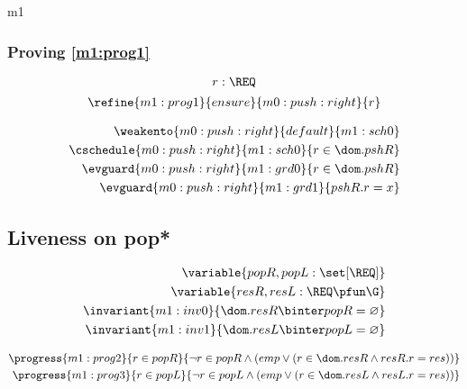 \documentclass[12pt]{amsart}
\begin{document}
\begin{machine}{m1}
\subsubsection{Proving \ref{m1:prog1}}
\[ \indices{m0:push:right}{ r : \REQ } \]
\begin{align*}
\refine{m1:prog1}{ensure}{m0:push:right}{ \index{r}{r} }
\end{align*}

\begin{align*}
\weakento{m0:push:right}{default}{m1:sch0}
\\ \cschedule{m0:push:right}{m1:sch0}{ r \in \dom.pshR }
\\ \evguard{m0:push:right}{m1:grd0}{ r \in \dom.pshR }
\\ \evguard{m0:push:right}{m1:grd1}{ pshR.r = x }
\end{align*}

\subsection{Liveness on pop*}

\begin{align*}
\variable{ popR, popL : \set [\REQ]}
\\ \variable{ resR, resL : \REQ \pfun \G }
\\ \invariant{m1:inv0}{ \dom.resR \binter popR = \emptyset }
\\ \invariant{m1:inv1}{ \dom.resL \binter popL = \emptyset }
\end{align*}

\begin{align*}
\progress{m1:prog2}{ r \in popR }{ \neg r \in popR \land (emp \lor (r \in \dom.resR \land resR.r = res))  }
\\ \progress{m1:prog3}{ r \in popL }{ \neg r \in popL \land (emp \lor (r \in \dom.resL \land resL.r = res))  }
\end{align*}


\end{machine}
\end{document}
